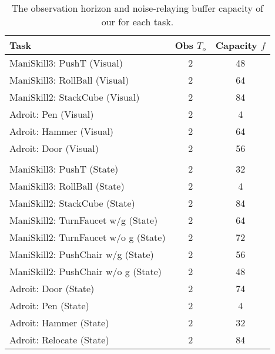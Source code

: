 \begin{table}[!ht]
\caption{The observation horizon and noise-relaying buffer capacity of our \ours for each task.}
\label{table:rnr_dp_buffer_capacity}
\setlength{\tabcolsep}{3.5pt}
\begin{center}
{{
\begin{tabular}{l c c}
\toprule[1pt]
\textbf{Task}
& \textbf{Obs $T_o$}
& \textbf{Capacity $f$}
\\
\midrule
ManiSkill3: PushT (Visual) & 2 & 48 \\
ManiSkill3: RollBall (Visual) & 2 & 64 \\
ManiSkill2: StackCube (Visual) & 2 & 84 \\
Adroit: Pen (Visual) & 2 & 4 \\
Adroit: Hammer (Visual) & 2 & 64 \\
Adroit: Door (Visual) & 2 & 56 \\
& \\
ManiSkill3: PushT (State) & 2 & 32 \\
ManiSkill3: RollBall (State) & 2 & 4  \\
ManiSkill2: StackCube (State) & 2 & 84 \\
ManiSkill2: TurnFaucet w/g (State) & 2 & 64 \\
ManiSkill2: TurnFaucet w/o g (State) & 2 & 72 \\
ManiSkill2: PushChair w/g (State) & 2 & 56\\
ManiSkill2: PushChair w/o g (State) & 2 & 48\\
Adroit: Door (State) & 2 & 74 \\
Adroit: Pen (State) & 2 & 4 \\
Adroit: Hammer (State) & 2 & 32 \\
Adroit: Relocate (State) & 2 & 84 \\
\bottomrule[1pt]
\end{tabular}
}}
\end{center}
\vspace{-12pt}
\end{table}

